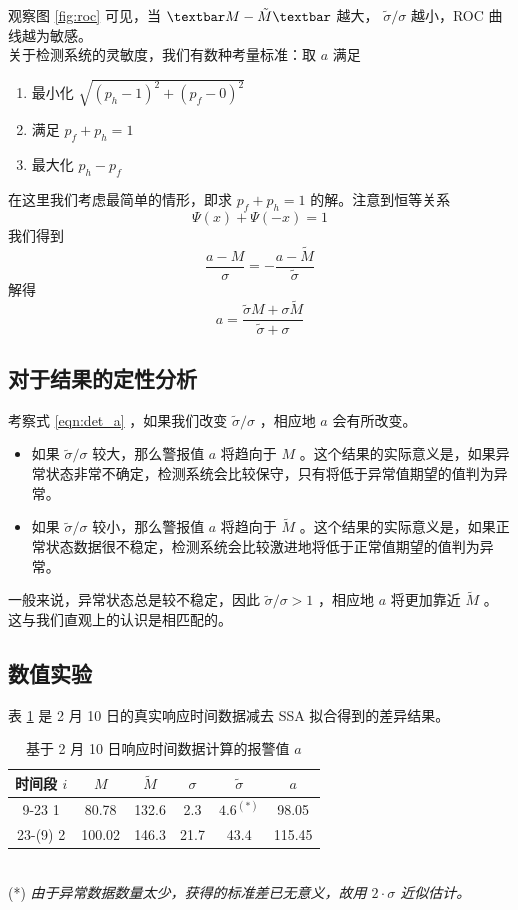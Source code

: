 \documentclass[a4paper]{article}
\begin{document}
观察图 \ref{fig:roc} 可见，当 $\textbar M - \tilde{M} \textbar $ 越大， $ \tilde{\sigma} / \sigma $ 越小，ROC 曲线越为敏感。
\\
关于检测系统的灵敏度，我们有数种考量标准：取 $a$ 满足
\begin{enumerate}
	\item 最小化 $\sqrt{(p_h - 1)^2 + (p_f - 0)^2}$
	\item 满足 $p_f + p_h = 1$
	\item 最大化 $p_h - p_f$
\end{enumerate}
在这里我们考虑最简单的情形，即求 $p_f + p_h = 1$ 的解。注意到恒等关系 $$\Psi(x) + \Psi(-x) = 1$$ 我们得到
\begin{equation}
	\label{eqn:det_a_formula}
	\frac{a-M}{\sigma} = -\frac{a-\tilde{M}}{\tilde{\sigma}}
\end{equation}
解得
\begin{equation}
	\label{eqn:det_a}
	a = \frac{\tilde{\sigma}M + \sigma \tilde{M}}{\tilde{\sigma} + \sigma}
\end{equation}

\subsection{对于结果的定性分析}
考察式 \ref{eqn:det_a} ，如果我们改变 $\tilde{\sigma}/\sigma$ ，相应地 $a$ 会有所改变。
\begin{itemize}
\item 如果 $\tilde{\sigma}/\sigma$ 较大，那么警报值 $a$ 将趋向于 $M$ 。这个结果的实际意义是，如果异常状态非常不确定，检测系统会比较保守，只有将低于异常值期望的值判为异常。
\item 如果 $\tilde{\sigma}/\sigma$ 较小，那么警报值 $a$ 将趋向于 $\tilde{M}$ 。这个结果的实际意义是，如果正常状态数据很不稳定，检测系统会比较激进地将低于正常值期望的值判为异常。
\end{itemize}
一般来说，异常状态总是较不稳定，因此 $\tilde{\sigma}/\sigma > 1$ ，相应地 $a$ 将更加靠近 $\tilde{M}$ 。
这与我们直观上的认识是相匹配的。
\subsection{数值实验}
表 \ref{tab:test_roc} 是 2 月 10 日的真实响应时间数据减去 SSA 拟合得到的差异结果。
\begin{table}[htbp]
	\centering
	\caption{基于 2 月 10 日响应时间数据计算的报警值 $a$}
	\label{tab:test_roc}
\begin{tabular}{c|cccc|c}
\hline
时间段 $i$  & $M$   & $\tilde{M}$ & $\sigma$ & $\tilde{\sigma}$ & $a$    \\
\hline
9-23 1   & 80.78 & 132.6        & 2.3     & $4.6^{(*)} $     & 98.05 \\
23-(9) 2 & 100.02 & 146.3        & 21.7    & 43.4             & 115.45 \\
\hline
\end{tabular}
\end{table}\\
(*) \emph{由于异常数据数量太少，获得的标准差已无意义，故用 $2 \cdot \sigma$ 近似估计。}
\end{document}
